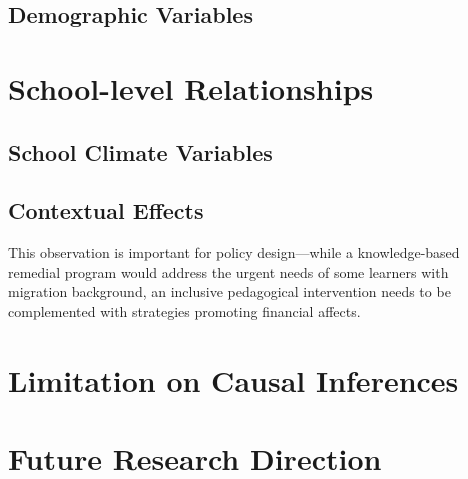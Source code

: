 \documentclass[a4paper,11pt,UKenglish,twoside,openright]{report}\usepackage[]{graphicx}\usepackage[]{color}
\begin{document}
\subsection{Demographic Variables}

\section{School-level Relationships}

\subsection{School Climate Variables}

\subsection{Contextual Effects}



This observation is important for policy design---while a knowledge-based remedial program would address the urgent needs of some learners with migration background, an inclusive pedagogical intervention needs to be complemented with strategies promoting financial affects.

\section{Limitation on Causal Inferences}


\section{Future Research Direction}


\newpage
\printbibliography[title=References]





\begin{appendices}
    
    
%     
%    
%    
%    
%    
%    
\end{appendices}

\cleardoublepage
{}
{}
\printindex[a]

\cleardoublepage
{}
{}
\printindex
\end{document}
